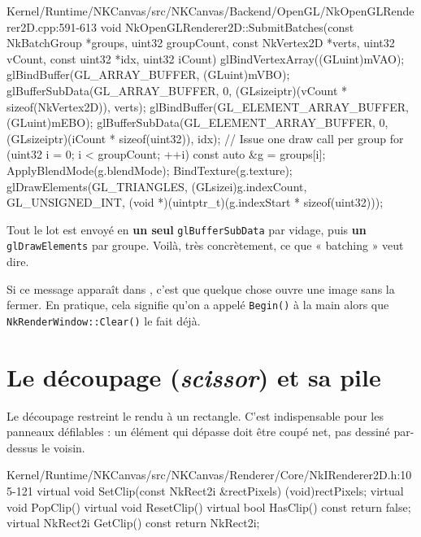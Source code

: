\begin{nkcode}{Kernel/Runtime/NKCanvas/src/NKCanvas/Backend/OpenGL/NkOpenGLRenderer2D.cpp:591-613}
void NkOpenGLRenderer2D::SubmitBatches(const NkBatchGroup *groups, uint32 groupCount,
                                       const NkVertex2D *verts, uint32 vCount,
                                       const uint32 *idx, uint32 iCount) {
    glBindVertexArray((GLuint)mVAO);
    glBindBuffer(GL_ARRAY_BUFFER, (GLuint)mVBO);
    glBufferSubData(GL_ARRAY_BUFFER, 0, (GLsizeiptr)(vCount * sizeof(NkVertex2D)), verts);
    glBindBuffer(GL_ELEMENT_ARRAY_BUFFER, (GLuint)mEBO);
    glBufferSubData(GL_ELEMENT_ARRAY_BUFFER, 0, (GLsizeiptr)(iCount * sizeof(uint32)), idx);
    // Issue one draw call per group
    for (uint32 i = 0; i < groupCount; ++i) {
        const auto &g = groups[i];
        ApplyBlendMode(g.blendMode);
        BindTexture(g.texture);
        glDrawElements(GL_TRIANGLES, (GLsizei)g.indexCount, GL_UNSIGNED_INT,
                       (void *)(uintptr_t)(g.indexStart * sizeof(uint32)));
    }
}
\end{nkcode}

Tout le lot est envoyé en \textbf{un seul} \texttt{glBufferSubData} par vidage,
puis \textbf{un} \texttt{glDrawElements} par groupe. Voilà, très concrètement,
ce que « batching » veut dire.

\begin{nkpiege}
\begin{nkcode}{Kernel/Runtime/NKCanvas/src/NKCanvas/Renderer/Batch/NkBatchRenderer2D.cpp:27-31}
bool NkBatchRenderer2D::Begin() {
    if (mInFrame) {
        logger.Warnf("[NkBatch] Begin() called twice");
        return false;
    }
\end{nkcode}
Si ce message apparaît dans , c'est que quelque chose ouvre
une image sans la fermer. En pratique, cela signifie qu'on a appelé
\texttt{Begin()} à la main alors que \texttt{NkRenderWindow::Clear()} le fait
déjà.
\end{nkpiege}

\section{Le découpage (\emph{scissor}) et sa pile}

Le découpage restreint le rendu à un rectangle. C'est indispensable pour les
panneaux défilables : un élément qui dépasse doit être coupé net, pas dessiné
par-dessus le voisin.

\begin{nkcode}{Kernel/Runtime/NKCanvas/src/NKCanvas/Renderer/Core/NkIRenderer2D.h:105-121}
virtual void SetClip(const NkRect2i &rectPixels) { (void)rectPixels; }
virtual void PopClip() {}
virtual void ResetClip() {}
virtual bool HasClip() const { return false; }
virtual NkRect2i GetClip() const { return NkRect2i{}; }
\end{nkcode}


